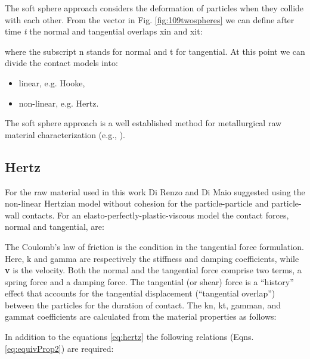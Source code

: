 
The soft sphere approach considers the deformation of particles when they
collide with each other. From the vector in Fig. \ref{fig:109twospheres} we can
define after time \textit{t} the normal and tangential overlaps \acs{xin} and
\acs{xit}:


where the subscript \acs{n} stands for normal and \acs{t} for tangential. 
At this point we can divide the contact models into:
\begin{itemize}
  \item{linear, e.g. Hooke,}
  \item{non-linear, e.g. Hertz.}
\end{itemize}

The soft sphere approach is a well established method for metallurgical raw
material characterization (e.g., \citet{RefWorks:71, RefWorks:74, RefWorks:76,
RefWorks:79, RefWorks:81, RefWorks:92, RefWorks:97, RefWorks:99, RefWorks:108}).

\subsection{Hertz}
\label{subsec:hertz}

For the raw material used in this work 
Di Renzo and Di Maio \cite{RefWorks:145} suggested using the non-linear
Hertzian model without cohesion for the particle-particle and particle-wall contacts. 
For an elasto-perfectly-plastic-viscous model the contact forces, normal and
tangential, are:


The Coulomb's law of friction is the condition in the tangential force
formulation.\\
Here, \acs{k} and \acs{gamma} are respectively the stiffness and damping
coefficients, while \textbf{v} is the velocity.
Both the normal and the tangential
force comprise two terms, a spring force and a damping force. 
The tangential (or shear) force is a ``history'' effect that accounts for the
tangential displacement (``tangential overlap'') between the particles for the
duration of contact.
The \acs{kn}, \acs{kt}, \acs{gamman}, and \acs{gammat} coefficients are
calculated from the material properties as follows:

In addition to the equations \ref{eq:hertz} the following relations (Eqns. \ref{eq:equivProp2}) are required:



